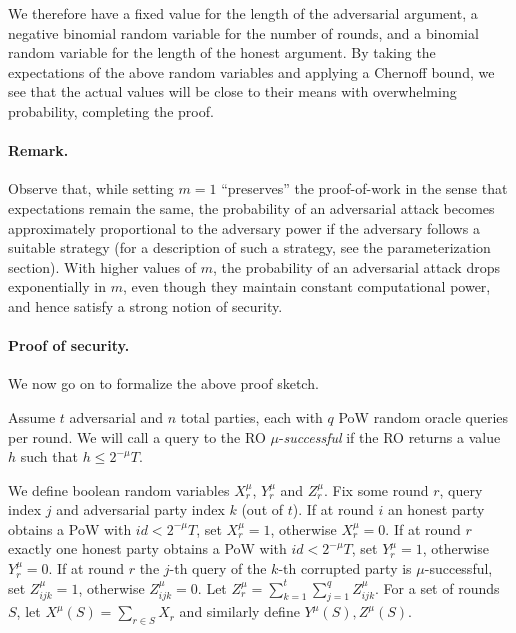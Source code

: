 We therefore have a fixed value for the length of the adversarial argument, a
negative binomial random variable for the number of rounds, and a binomial
random variable for the length of the honest argument. By taking the
expectations of the above random variables and applying a Chernoff bound, we see
that the actual values will be close to their means with overwhelming
probability, completing the proof.

\paragraph{Remark.}
Observe that, while setting $m = 1$ ``preserves'' the proof-of-work in the sense
that expectations remain the same, the probability of an adversarial attack
becomes approximately proportional to the adversary power if the adversary
follows a suitable strategy (for a description of such a strategy, see the
parameterization section). With higher values of $m$, the probability of an
adversarial attack drops exponentially in $m$, even though they maintain
constant computational power, and hence satisfy a strong notion of security.

\paragraph{Proof of security. }
We now go on to formalize the above proof sketch.

Assume $t$ adversarial and $n$ total parties, each with $q$
PoW random oracle queries per round. We will call a query to the
RO $\mu$-\textit{successful} if the RO returns a value $h$
such that $h \leq 2^{-\mu}T$.

We define boolean random variables $X_r^\mu$, $Y_r^\mu$ and $Z_r^\mu$. Fix some
round $r$, query index $j$ and adversarial party index $k$ (out of $t$). If at
round $i$ an honest party obtains a PoW with $id < 2^{-\mu}T$, set $X_r^\mu =
1$, otherwise $X_r^\mu = 0$. If at round $r$ exactly one honest party obtains a
PoW with $id < 2^{-\mu}T$, set $Y_r^\mu = 1$, otherwise $Y_r^\mu = 0$. If at
round $r$ the $j$-th query of the $k$-th corrupted party is $\mu$-successful,
set $Z^\mu_{ijk} = 1$, otherwise $Z^\mu_{ijk} = 0$. Let $Z^\mu_r = \sum_{k=1}^t
\sum_{j=1}^q Z^\mu_{ijk}$. For a set of rounds $S$, let $X^\mu(S) = \sum_{r \in
S} X_r$ and similarly define $Y^\mu(S), Z^\mu(S)$.

